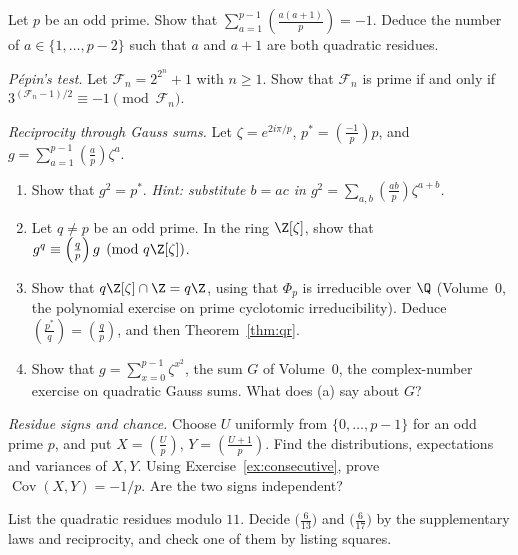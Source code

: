 \begin{exercise}[$\star\star$]\label{ex:consecutive}
Let $p$ be an odd prime. Show that $\displaystyle\sum_{a=1}^{p-1}\left(\frac{a(a+1)}p\right)=-1$. Deduce the number of $a\in\{1,\dots,p-2\}$ such that $a$ and $a+1$ are both quadratic residues.
\end{exercise}

\begin{exercise}[$\star\star$]\label{ex:pepin}
\emph{P\'epin's test.} Let $\mathcal F_n=2^{2^n}+1$ with $n\ge1$. Show that $\mathcal F_n$ is prime if and only if $3^{(\mathcal F_n-1)/2}\equiv-1\pmod{\mathcal F_n}$.
\end{exercise}

\begin{exercise}[$\star\star\star$]\label{ex:gausssum}
\emph{Reciprocity through Gauss sums.} Let $\zeta=e^{2i\pi/p}$, $p^*=\left(\frac{-1}p\right)p$, and $g=\sum_{a=1}^{p-1}\left(\frac ap\right)\zeta^a$.
\begin{enumerate}[label=(\alph*)]
\item Show that $g^2=p^*$. \emph{Hint: substitute $b=ac$ in $g^2=\sum_{a,b}\left(\frac{ab}p\right)\zeta^{a+b}$.}
\item Let $q\ne p$ be an odd prime. In the ring $\Z[\zeta]$, show that $g^q\equiv\left(\frac qp\right)g\pmod{q\Z[\zeta]}$.
\item Show that $q\Z[\zeta]\cap\Z=q\Z$, using that $\Phi_p$ is irreducible over $\Q$ (Volume~0, the polynomial exercise on prime cyclotomic irreducibility). Deduce $\left(\frac{p^*}q\right)=\left(\frac qp\right)$, and then Theorem~\ref{thm:qr}.
\item Show that $g=\sum_{x=0}^{p-1}\zeta^{x^2}$, the sum $G$ of Volume~0, the complex-number exercise on quadratic Gauss sums. What does (a) say about $G$?
\end{enumerate}
\end{exercise}

\begin{exercise}[$\star\star$]\label{ex:t1-residue-chance}
\emph{Residue signs and chance.} Choose $U$ uniformly from
$\{0,\dots,p-1\}$ for an odd prime $p$, and put
$X=\left(\frac Up\right)$, $Y=\left(\frac{U+1}p\right)$.
Find the distributions, expectations and variances of $X,Y$.
Using Exercise~\ref{ex:consecutive}, prove
$\operatorname{Cov}(X,Y)=-1/p$. Are the two signs independent?
\end{exercise}

\begin{exercise}[$\star$]\label{ex:t1-res11}
List the quadratic residues modulo $11$. Decide $\bigl(\frac{6}{13}\bigr)$ and $\bigl(\frac{6}{17}\bigr)$ by the supplementary laws and reciprocity, and check one of them by listing squares.
\end{exercise}

